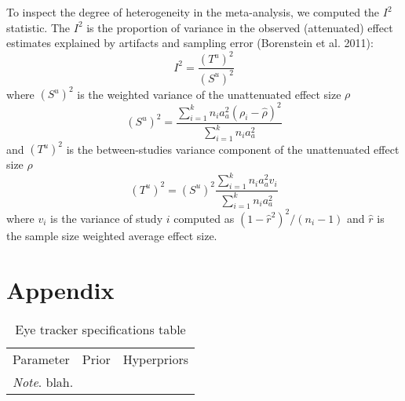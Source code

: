 \documentclass{article}
\begin{document}
To inspect the degree of heterogeneity in the meta-analysis, we computed the $I^2$ statistic. The $I^2$ is the proportion of variance in the observed (attenuated) effect estimates explained by artifacts and sampling error (Borenstein et al. 2011): 
%
\begin{equation}
\label{eq:i2_statistic}
I^2 = \frac{(T^u)^2}{(S^u)^2}
\end{equation}
%
where $(S^u)^2$ is the weighted variance of the unattenuated effect size $\rho$
%
\begin{equation}
\label{eq:Su2_var}
(S^u)^2 = \frac{\sum_{i=1}^k n_i a_a^2 (\rho_i - \hat{\rho})^2}{\sum_{i=1}^k n_i a_a^2}
\end{equation}
%
and $(T^u)^2$ is the between-studies variance component of the unattenuated effect size $\rho$
%
\begin{equation}
\label{eq:Tu2_var}
(T^u)^2 = (S^u)^2 \frac{\sum_{i=1}^k n_i a_a^2 v_i}{\sum_{i=1}^k n_i a_a^2}
\end{equation}
%
where $v_i$ is the variance of study $i$ computed as $(1 - \hat{r}^2)^2 / (n_i - 1)$ and $\hat{r}$ is the sample size weighted average effect size.








\section{Appendix}
\label{appendix}


\begin{table*}
\caption{Eye tracker specifications table}
\label{tab:eyetracker_specifications}
\centering
\begin{tabularx}{\columnwidth}{p{}p{}p{}}
  \cmidrule(lr){1-3}
    \multicolumn{1}{l}{Parameter} &
    \multicolumn{1}{l}{Prior} &
    \multicolumn{1}{l}{Hyperpriors} \\
  \cmidrule(lr){1-3}

  \cmidrule(lr){1-3}

\multicolumn{3}{p{0.95\columnwidth}}{\textit{Note}. blah.}
\end{tabularx}
\end{table*}
\clearpage
\end{document}
